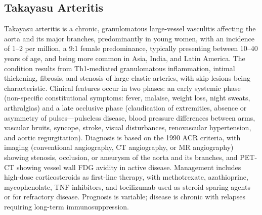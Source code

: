 \subsection{Takayasu Arteritis}
\label{sec:Takayasu Arteritis}
Takayasu arteritis is a chronic, granulomatous large-vessel vasculitis affecting the aorta and its major branches, predominantly in young women, with an incidence of 1--2 per million, a 9:1 female predominance, typically presenting between 10--40 years of age, and being more common in Asia, India, and Latin America. The condition results from Th1-mediated granulomatous inflammation, intimal thickening, fibrosis, and stenosis of large elastic arteries, with skip lesions being characteristic. Clinical features occur in two phases: an early systemic phase (non-specific constitutional symptoms: fever, malaise, weight loss, night sweats, arthralgias) and a late occlusive phase (claudication of extremities, absence or asymmetry of pulses---pulseless disease, blood pressure differences between arms, vascular bruits, syncope, stroke, visual disturbances, renovascular hypertension, and aortic regurgitation). Diagnosis is based on the 1990 ACR criteria, with imaging (conventional angiography, CT angiography, or MR angiography) showing stenosis, occlusion, or aneurysm of the aorta and its branches, and PET-CT showing vessel wall FDG avidity in active disease. Management includes high-dose corticosteroids as first-line therapy, with methotrexate, azathioprine, mycophenolate, TNF inhibitors, and tocilizumab used as steroid-sparing agents or for refractory disease. Prognosis is variable; disease is chronic with relapses requiring long-term immunosuppression.

